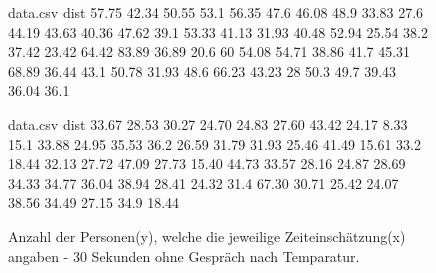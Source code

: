 \documentclass{Paper}
\begin{document}
\begin{figure}[H]
\begin{filecontents}{data.csv}
dist
  57.75 
 42.34 
 50.55 
 53.1 
 56.35 
 47.6 
 46.08 
 48.9 
 33.83 
 27.6 
 44.19 
 43.63 
 40.36 
 47.62 
 39.1 
 53.33 
 41.13 
 31.93 
 40.48 
 52.94 
25.54 
 38.2 
37.42 
23.42 
 64.42 
 83.89 
36.89 
20.6 
 60 
 54.08  
 54.71 
 38.86 
 41.7 
 45.31 
 68.89 
36.44 
 43.1 
50.78 
31.93 
48.6 
66.23 
 43.23 
 28 
 50.3 
 49.7
 39.43 
 36.04 
36.1 
\end{filecontents}
\begin{minipage}[t]{0.49\linewidth}
\caption{Anzahl der Personen(y), welche die jeweilige Zeiteinschätzung(x) angaben - 40 Sekunden ohne Gespräch nach Temperatur.}
\label{HistZeit40sekTemp}
\end{minipage}
\hfill
\begin{filecontents}{data.csv}
dist
  33.67 
 28.53 
 30.27 
 24.70 
 24.83 
 27.60 
 43.42 
 24.17 
 8.33 
 15.1 
 33.88 
 24.95 
 35.53 
 36.2 
 26.59 
 31.79
 31.93 
 25.46 
 41.49 
 15.61 
 33.2
 18.44 
 32.13 
 27.72 
 47.09 
 27.73 
 15.40 
 44.73 
 33.57 
 28.16  
 24.87 
 28.69 
 34.33 
 34.77 
 36.04 
 38.94 
 28.41 
 24.32 
 31.4 
 67.30 
 30.71 
 25.42 
 24.07 
 38.56 
 34.49 
 27.15  
 34.9 
18.44 
\end{filecontents}
\begin{minipage}[t]{0.49\linewidth}
\caption{Anzahl der Personen(y), welche die jeweilige Zeiteinschätzung(x) angaben - 30 Sekunden ohne Gespräch nach Temparatur.}
\label{HistZeit30sekTemp}
\end{minipage}
\end{figure}
\end{document}
